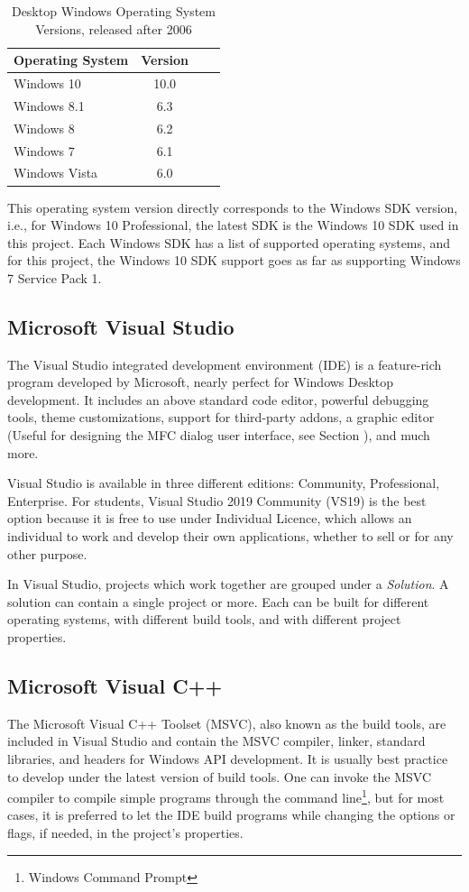\begin{table}[hbt]
\centering
\caption{Desktop Windows Operating System Versions, released after 2006}
\label{osversions}
\begin{tabular}{|l|c|l|l|}
\hline
Operating System & Version \\ \hline
Windows 10       & 10.0    \\ \hline
Windows 8.1      & 6.3     \\ \hline
Windows 8        & 6.2     \\ \hline
Windows 7        & 6.1     \\ \hline
Windows Vista    & 6.0     \\ \hline
\end{tabular}
\end{table}

This operating system version directly corresponds to the Windows SDK version, i.e., for Windows 10 Professional, the latest SDK is the Windows 10 SDK used in this project. Each Windows SDK has a list of supported operating systems, and for this project, the Windows 10 SDK support goes as far as supporting Windows 7 Service Pack 1.\cite{Win10SDK}


\subsection*{Microsoft Visual Studio}
\label{ch2vs19}
The Visual Studio integrated development environment (IDE) is a feature-rich program developed by Microsoft, nearly perfect for Windows Desktop development. It includes an above standard code editor, powerful debugging tools, theme customizations, support for third-party addons, a graphic editor (Useful for designing the MFC dialog user interface, see Section ), and much more.\cite{VStudio}

Visual Studio is available in three different editions: Community, Professional, Enterprise. For students, Visual Studio 2019 Community (VS19) is the best option because it is free to use under Individual Licence, which allows an individual to work and develop their own applications, whether to sell or for any other purpose.\cite{VS19TOS}

In Visual Studio, projects which work together are grouped under a \textit{Solution}. A solution can contain a single project or more. Each can be built for different operating systems, with different build tools, and with different project properties.

\subsection*{Microsoft Visual C++}
\label{ch2msvc}
The Microsoft Visual C++ Toolset (MSVC), also known as the build tools, are included in Visual Studio and contain the MSVC compiler, linker, standard libraries, and headers for Windows API development. It is usually best practice to develop under the latest version of build tools. One can invoke the MSVC compiler to compile simple programs through the command line\footnote{Windows Command Prompt}, but for most cases, it is preferred to let the IDE build programs while changing the options or flags, if needed, in the project's properties.\cite{MsVc}


